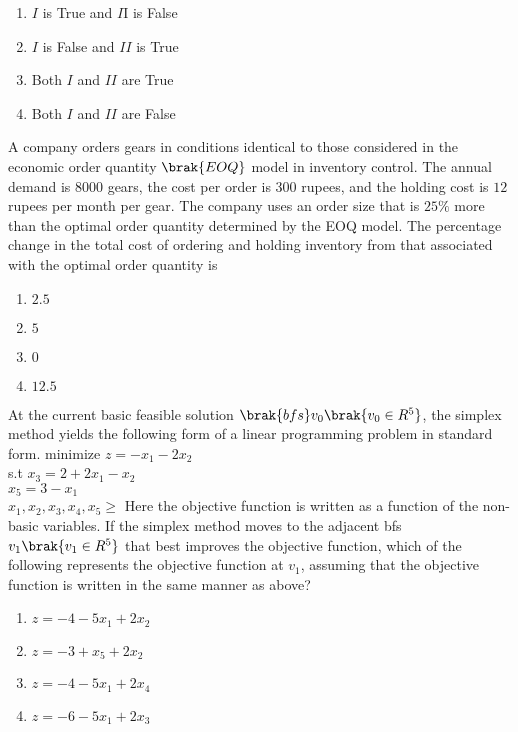 \begin{enumerate}
    \item $I$ is True and $I$I is False\\
    \item $I$ is False and $II$ is True\\
    \item Both $I$ and $II$ are True\\
     \item Both $I$ and $II$ are False\\
\end{enumerate}
\item A company orders gears in conditions identical to those considered in the economic
order quantity $\brak{EOQ}$ model in inventory control. The annual demand is $8000$ gears,
the cost per order is $300$ rupees, and the holding cost is $12$ rupees per month per gear.
The company uses an order size that is $25\%$ more than the optimal order quantity
determined by the EOQ model. The percentage change in the total cost of ordering
and holding inventory from that associated with the optimal order quantity is\\
\begin{enumerate}
\item $2.5$\\
\item $5$\\
\item $0$\\
\item $12.5$\\
\end{enumerate}
\item At the current basic feasible solution $\brak{bfs} v_{0} \brak{v_{0} \in R^{5}}$, the simplex method yields the following form of a linear programming problem in standard form.
minimize $z=-x_{1}-2x_{2}$\\
s.t      $x_{3}=2+2x_{1}-x_{2}$\\
         $x_{5}=3-x_{1}$\\
         $x_{1},x_{2},x_{3},x_{4},x_{5} \geq$
Here the objective function is written as a function of the non-basic variables. If the
simplex method moves to the adjacent bfs $v_{1} \brak{v_{1} \in R^{5}}$ that best improves the
objective function, which of the following represents the objective function at $v_{1}$,
assuming that the objective function is written in the same manner as above?\\
\begin{enumerate}
    \item$z=-4-5x_{1}+2x_{2}$\\
    \item$z=-3+x_{5}+2x_{2}$\\
    \item$z=-4-5x_{1}+2x_{4}$\\
    \item$z=-6-5x_{1}+2x_{3}$\\
\end{enumerate}
 
